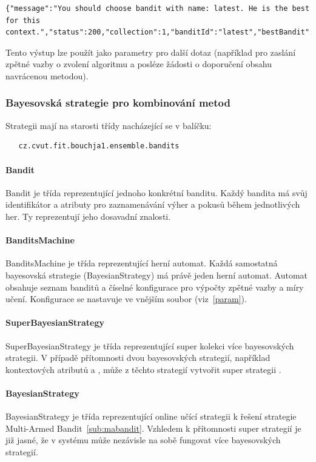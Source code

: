\documentclass[thesis=M,czech]{FITthesis}[2014/05/07]
\begin{document}
\begin{lstlisting}
{"message":"You should choose bandit with name: latest. He is the best for this context.","status":200,"collection":1,"banditId":"latest","bestBandit":2}
\end{lstlisting}

Tento výstup lze použít jako parametry pro další dotaz (například pro zaslání zpětné vazby o zvolení algoritmu a posléze žádosti o doporučení obsahu navrácenou metodou).

\subsubsection{Bayesovská strategie pro kombinování metod}

Strategii mají na starosti třídy nacházející se v balíčku:

\begin{verbatim}
   cz.cvut.fit.bouchja1.ensemble.bandits
\end{verbatim}

\paragraph{Bandit}
Bandit je třída reprezentující jednoho konkrétní banditu. Každý bandita má svůj identifikátor a atributy pro zaznamenávání výher a pokusů během jednotlivých her. Ty reprezentují jeho dosavadní znalosti.
\paragraph{BanditsMachine}
BanditsMachine je třída reprezentující herní automat. Každá samostatná bayesovská strategie (BayesianStrategy) má právě jeden herní automat. Automat obsahuje seznam banditů a číselné konfigurace pro výpočty zpětné vazby a míry učení. Konfigurace se nastavuje ve vnějším soubor (viz~\ref{param}).
\paragraph{SuperBayesianStrategy} SuperBayesianStrategy je třída reprezentující super kolekci více bayesovských strategii. V případě přítomnosti dvou bayesovských strategií, například kontextových atributů  a , může z těchto strategií vytvořit super strategii .
\paragraph{BayesianStrategy}	BayesianStrategy je třída reprezentující online učící strategii k řešení strategie Multi-Armed Bandit~\ref{sub:mabandit}. Vzhledem k přítomnosti super strategií je již jasné, že v systému může nezávisle na sobě fungovat více bayesovských strategií. 
\end{document}
